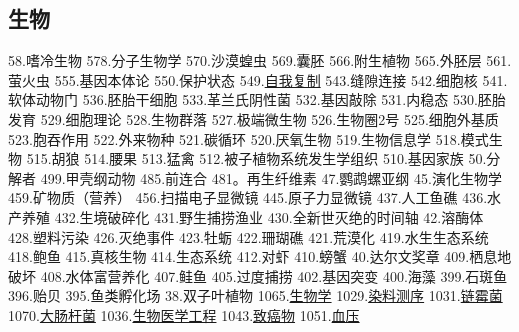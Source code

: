 \subsection{生物}
58.嗜冷生物
578.分子生物学
570.沙漠蝗虫
569.囊胚
566.附生植物
565.外胚层
561.萤火虫
555.基因本体论
550.保护状态
549.\href{https://wuli.wiki/assets/sogou/549.\%E8\%87\%AA\%E6\%88\%91\%E5\%A4\%8D\%E5\%88\%B6\%20-\%20\%E6\%90\%9C\%E7\%8B\%97\%E7\%A7\%91\%E5\%AD\%A6\%E7\%99\%BE\%E7\%A7\%91.html}{自我复制}
543.缝隙连接
542.细胞核
541.软体动物门
536.胚胎干细胞
533.革兰氏阴性菌
532.基因敲除
531.内稳态
530.胚胎发育
529.细胞理论
528.生物群落
527.极端微生物
526.生物圈2号
525.细胞外基质
523.胞吞作用
522.外来物种
521.碳循环
520.厌氧生物
519.生物信息学
518.模式生物
515.胡狼
514.腰果
513.猛禽
512.被子植物系统发生学组织
510.基因家族
50.分解者
499.甲壳纲动物
485.前连合
481。再生纤维素
47.鹦鹉螺亚纲
45.演化生物学
459.矿物质（营养）
456.扫描电子显微镜
445.原子力显微镜
437.人工鱼礁
436.水产养殖
432.生境破碎化
431.野生捕捞渔业
430.全新世灭绝的时间轴
42.溶酶体
428.塑料污染
426.灭绝事件
423.牡蛎
422.珊瑚礁
421.荒漠化
419.水生生态系统
418.鲍鱼
415.真核生物
414.生态系统
412.对虾
410.螃蟹
40.达尔文奖章
409.栖息地破坏
408.水体富营养化
407.鲑鱼
405.过度捕捞
402.基因突变
400.海藻
399.石斑鱼
396.贻贝
395.鱼类孵化场
38.双子叶植物
1065.\href{https://wuli.wiki/assets/sogou/1065.\%E7\%94\%9F\%E7\%89\%A9\%E5\%AD\%A6\%20-\%20\%E6\%90\%9C\%E7\%8B\%97\%E7\%A7\%91\%E5\%AD\%A6\%E7\%99\%BE\%E7\%A7\%91.html}{生物学}
1029.\href{https://wuli.wiki/assets/sogou/1029.\%E6\%9F\%93\%E6\%96\%99\%E6\%B5\%8B\%E5\%BA\%8F\%20-\%20\%E6\%90\%9C\%E7\%8B\%97\%E7\%A7\%91\%E5\%AD\%A6\%E7\%99\%BE\%E7\%A7\%91.html}{染料测序}
1031.\href{https://wuli.wiki/assets/sogou/1031.\%E9\%93\%BE\%E9\%9C\%89\%E8\%8F\%8C\%20-\%20\%E6\%90\%9C\%E7\%8B\%97\%E7\%A7\%91\%E5\%AD\%A6\%E7\%99\%BE\%E7\%A7\%91.html}{链霉菌}
1070.\href{https://wuli.wiki/assets/sogou/1070.\%E5\%A4\%A7\%E8\%82\%A0\%E6\%9D\%86\%E8\%8F\%8C\%20-\%20\%E6\%90\%9C\%E7\%8B\%97\%E7\%A7\%91\%E5\%AD\%A6\%E7\%99\%BE\%E7\%A7\%91.html}{大肠杆菌}
1036.\href{https://wuli.wiki/assets/sogou/1036.\%E7\%94\%9F\%E7\%89\%A9\%E5\%8C\%BB\%E5\%AD\%A6\%E5\%B7\%A5\%E7\%A8\%8B\%20-\%20\%E6\%90\%9C\%E7\%8B\%97\%E7\%A7\%91\%E5\%AD\%A6\%E7\%99\%BE\%E7\%A7\%91.html}{生物医学工程}
1043.\href{https://wuli.wiki/assets/sogou/1043.\%E8\%87\%B4\%E7\%99\%8C\%E7\%89\%A9\%20-\%20\%E6\%90\%9C\%E7\%8B\%97\%E7\%A7\%91\%E5\%AD\%A6\%E7\%99\%BE\%E7\%A7\%91.html}{致癌物}
1051.\href{https://wuli.wiki/assets/sogou/1051.\%E8\%A1\%80\%E5\%8E\%8B\%20-\%20\%E6\%90\%9C\%E7\%8B\%97\%E7\%A7\%91\%E5\%AD\%A6\%E7\%99\%BE\%E7\%A7\%91.html}{血压}

